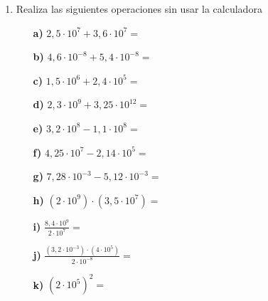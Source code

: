 \documentclass[a4paper,12pt]{article}
\begin{document}
\begin{enumerate}
        \item Realiza las siguientes operaciones sin usar la calculadora
        \begin{enumerate}
                \item[\textbf{a)}] $2,5 \cdot 10^7 + 3,6 \cdot 10^7 =$
                \item[\textbf{b)}] $4,6 \cdot 10^{-8} + 5,4 \cdot 10^{-8} =$
                \item[\textbf{c)}] $1,5 \cdot 10^6 + 2,4 \cdot 10^5 =$
                \item[\textbf{d)}] $2,3 \cdot 10^9 + 3,25 \cdot 10^{12} =$
                \item[\textbf{e)}] $3,2 \cdot 10^8 - 1,1 \cdot 10^8 =$
                \item[\textbf{f)}] $4,25 \cdot 10^7 - 2,14 \cdot 10^5 =$
                \item[\textbf{g)}] $7,28 \cdot 10^{-3} - 5,12 \cdot 10^{-3} =$
                \item[\textbf{h)}] $(2 \cdot 10^9) \cdot (3,5 \cdot 10^7) =$
                \item[\textbf{i)}] $\frac{8,4 \cdot 10^9}{2 \cdot 10^7} =$
                \item[\textbf{j)}] $\frac{(3,2 \cdot 10^{-3}) \cdot (4 \cdot 10^5)}{2 \cdot 10^{-8}} =$
                \item[\textbf{k)}] $(2 \cdot 10^5)^2 =$
        \end{enumerate}

\end{enumerate}
\end{document}
